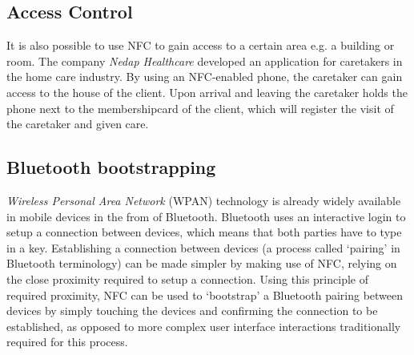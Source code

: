 \subsection{Access Control}
It is also possible to use NFC to gain access to a certain area e.g. a building or room.
The company \textit{Nedap Healthcare} developed an application for caretakers in the home care industry.
By using an NFC-enabled phone, the caretaker can gain access to the house of the client.
Upon arrival and leaving the caretaker holds the phone next to the membershipcard of the client, which will register the visit of the caretaker and given care. \cite{Nedap2,Nedap1}

\subsection{Bluetooth bootstrapping}
\textit{Wireless Personal Area Network} (WPAN) technology is already widely available in mobile devices in the from of Bluetooth.
Bluetooth uses an interactive login to setup a connection between devices, which means that both parties have to type in a key.
Establishing a connection between devices (a process called `pairing' in Bluetooth terminology) can be made simpler by making use of NFC, relying on the close proximity required to setup a connection.
Using this principle of required proximity, NFC can be used to `bootstrap' a Bluetooth pairing between devices by simply touching the devices and confirming the connection to be established, as opposed to more complex user interface interactions traditionally required for this process.
\cite{scarfone2008guide}



